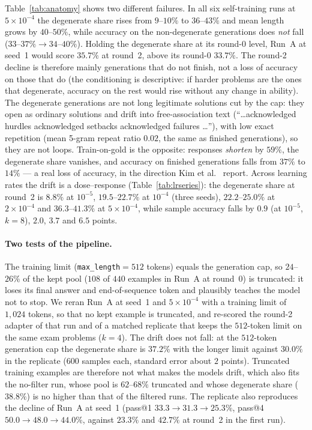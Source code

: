\documentclass[runningheads]{llncs}
\begin{document}
Table~\ref{tab:anatomy} shows two different failures. In all six self-training
runs at $5\times10^{-4}$ the degenerate share rises from $9$--$10\%$ to
$36$--$43\%$ and mean length grows by $40$--$50\%$, while accuracy on the
non-degenerate generations does \emph{not} fall ($33$--$37\%\to34$--$40\%$).
Holding the degenerate share at its round-0 level, Run~A at seed~1 would score
$35.7\%$ at round~2, above its round-0 $33.7\%$. The round-2 decline is therefore
mainly generations that do not finish, not a loss of accuracy on those that do
(the conditioning is descriptive: if harder problems are the ones that
degenerate, accuracy on the rest would rise without any change in ability). The
degenerate generations are not long legitimate solutions cut by the cap: they open
as ordinary solutions and drift into free-association text (``\ldots acknowledged
hurdles acknowledged setbacks acknowledged failures \ldots''), with low exact
repetition (mean 5-gram repeat ratio $0.02$, the same as finished generations), so
they are not loops. Train-on-gold is the opposite: responses \emph{shorten} by
$59\%$, the degenerate share vanishes, and accuracy on finished generations falls
from $37\%$ to $14\%$ --- a real loss of accuracy, in the direction Kim et
al.~\cite{ref_selfdistill} report. Across learning rates the drift is a dose--response
(Table~\ref{tab:lrseries}): the degenerate share at round~2 is $8.8\%$ at
$10^{-5}$, $19.5$--$22.7\%$ at $10^{-4}$ (three seeds), $22.2$--$25.0\%$ at
$2\times10^{-4}$ and $36.3$--$41.3\%$ at $5\times10^{-4}$, while sample accuracy
falls by $0.9$ (at $10^{-5}$, $k=8$), $2.0$, $3.7$ and $6.5$ points.

\paragraph{Two tests of the pipeline.}
The training limit (\texttt{max\_length}$=512$ tokens) equals the generation cap,
so $24$--$26\%$ of the kept pool ($108$ of $440$ examples in Run~A at round~0) is
truncated: it loses its final answer and end-of-sequence token and plausibly
teaches the model not to stop. We reran Run~A at seed~1 and $5\times10^{-4}$ with a
training limit of $1{,}024$ tokens, so that no kept example is truncated, and
re-scored the round-2 adapter of that run and of a matched replicate that keeps
the $512$-token limit on the same exam problems ($k=4$). The drift does not
fall: at the $512$-token generation cap the degenerate share is $37.2\%$ with the
longer limit against $30.0\%$ in the replicate ($600$ samples each, standard
error about $2$ points). Truncated training examples are therefore not what makes
the models drift, which also fits the no-filter run, whose pool is $62$--$68\%$
truncated and whose degenerate share ($38.8\%$) is no higher than that of the
filtered runs. The replicate also reproduces the decline of Run~A at seed~1
(pass@1 $33.3\to31.3\to25.3\%$, pass@4 $50.0\to48.0\to44.0\%$, against
$23.3\%$ and $42.7\%$ at round~2 in the first run).
\end{document}

